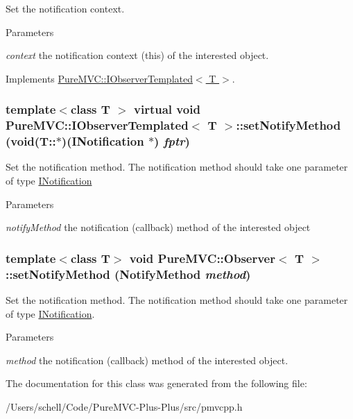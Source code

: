 Set the notification context. 
\begin{DoxyParams}{Parameters}
\item[{\em context}]the notification context (this) of the interested object. \end{DoxyParams}


Implements \hyperlink{class_pure_m_v_c_1_1_i_observer_templated_ad2f9264afea485375876ef3a976b0ba5}{PureMVC::IObserverTemplated$<$ T $>$}.\hypertarget{class_pure_m_v_c_1_1_i_observer_templated_a6d8b0b888b2d1efd0801b75451e7c8df}{
\subsubsection[{setNotifyMethod}]{\setlength{\rightskip}{0pt plus 5cm}template$<$class T $>$ virtual void {\bf PureMVC::IObserverTemplated}$<$ T $>$::setNotifyMethod (void(T::$\ast$)({\bf INotification} $\ast$) {\em fptr})}}
\label{class_pure_m_v_c_1_1_i_observer_templated_a6d8b0b888b2d1efd0801b75451e7c8df}


Set the notification method. The notification method should take one parameter of type {\ttfamily \hyperlink{class_pure_m_v_c_1_1_i_notification}{INotification}}


\begin{DoxyParams}{Parameters}
\item[{\em notifyMethod}]the notification (callback) method of the interested object \end{DoxyParams}
\hypertarget{class_pure_m_v_c_1_1_observer_a288e402c45c332dd8765bff6bcdd087e}{
\subsubsection[{setNotifyMethod}]{\setlength{\rightskip}{0pt plus 5cm}template$<$class T$>$ void {\bf PureMVC::Observer}$<$ T $>$::setNotifyMethod (NotifyMethod {\em method})}}
\label{class_pure_m_v_c_1_1_observer_a288e402c45c332dd8765bff6bcdd087e}


Set the notification method. The notification method should take one parameter of type {\ttfamily \hyperlink{class_pure_m_v_c_1_1_i_notification}{INotification}}.


\begin{DoxyParams}{Parameters}
\item[{\em method}]the notification (callback) method of the interested object. \end{DoxyParams}


The documentation for this class was generated from the following file:\begin{DoxyCompactItemize}
\item 
/Users/schell/Code/PureMVC-\/Plus-\/Plus/src/pmvcpp.h\end{DoxyCompactItemize}
